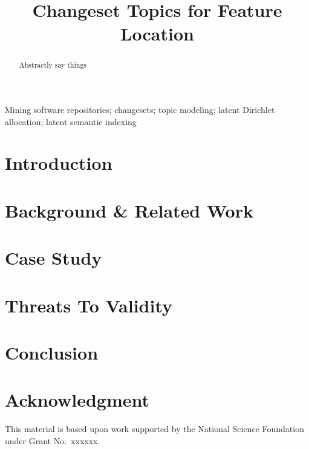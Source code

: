 \documentclass[conference]{IEEEtran}
\newcommand{\attn}[1]{{\color{red}#1}}
\begin{document}
\title{Changeset Topics for Feature Location}
\author{

    \and

}


\maketitle

\begin{abstract}
    Abstractly say things
\end{abstract}

\begin{IEEEkeywords}
Mining software repositories;
changesets;
topic modeling;
latent Dirichlet allocation;
latent semantic indexing
\end{IEEEkeywords}

\section{Introduction}
\label{sec:intro}


\section{Background \& Related Work}
\label{sec:related}


\section{Case Study}
\label{sec:study}


\section{Threats To Validity}
\label{sec:threats}


\section{Conclusion}
\label{sec:conclusion}


\section*{Acknowledgment}
This material is based upon work supported
by the National Science Foundation under Grant No.\ \attn{xxxxxx}.



\end{document}
